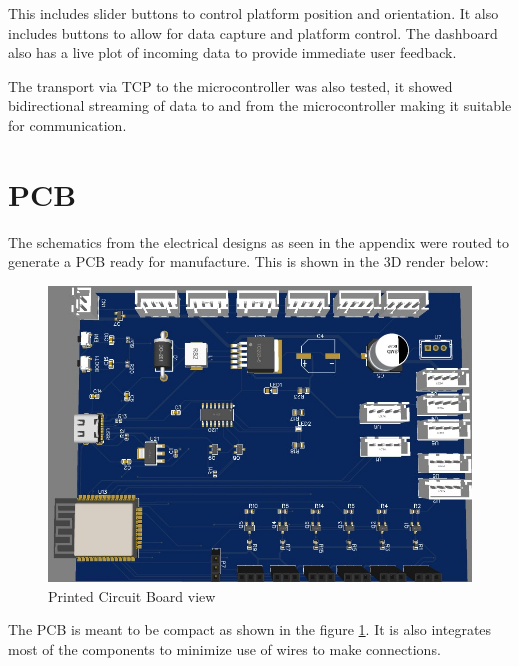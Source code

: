 This includes slider buttons to control platform position and orientation. It also includes buttons to allow for data capture  and platform control. The dashboard also has a live plot of incoming data to provide immediate user feedback.

The transport via TCP to the microcontroller was also tested, it showed bidirectional streaming of data to and from the microcontroller making it suitable for communication.

\section{PCB}
The schematics from the electrical designs as seen in the appendix were routed to generate a PCB ready for manufacture. This is shown in the 3D render below:
\begin{center}
	\begin{figure}[H]
	\centering
	\includegraphics[width=0.7\linewidth]{Figures/pcb}
	\caption[Printed Circuit Board view]{Printed Circuit Board view}
	\label{fig:pcb3d}
	\end{figure}
\end{center}
The PCB is meant to be compact as shown in the figure \ref{fig:pcb3d}. It is also integrates most of the components to minimize use of wires to make connections. 

